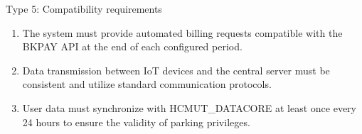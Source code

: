 Type 5: Compatibility requirements
\begin{enumerate}
    \item The system must provide automated billing requests compatible with the BKPAY API at the end of each configured period.
    \item Data transmission between IoT devices and the central server must be consistent and utilize standard communication protocols.
    \item User data must synchronize with HCMUT\_DATACORE at least once every 24 hours to ensure the validity of parking privileges.
\end{enumerate}